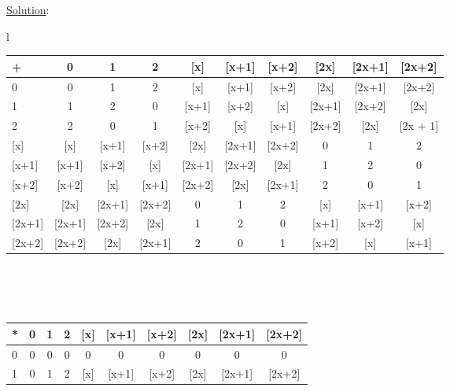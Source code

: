 \documentclass{article} %
\begin{document}
\underline{Solution}: 
\\
\begin{tabular}{l}
\begin{tabular}{l | c c c c c c c c c}
+               & 0            & 1             &     2        & [x]           & [x+1]     &[x+2]      & [2x]        & [2x+1] & [2x+2] \\ \hline
0                & 0            & 1             &     2        & [x]           & [x+1]     &[x+2]      & [2x]        & [2x+1] & [2x+2] \\
1                & 1            & 2             & 0            & [x+1]       & [x+2]    & [x]          & [2x+1]   & [2x+2] & [2x]      \\
2                & 2            & 0             & 1            & [x+2]       & [x]         & [x+1]     & [2x+2]   & [2x]     & [2x + 1] \\
{[}x]           & [x]         & [x+1]     & [x+2]     & [2x]         & [2x+1]  & [2x+2]    & 0            & 1          & 2            \\
{[}x+1]      & [x+1]     & [x+2]     & [x]         & [2x+1]     & [2x+2]  & [2x]        & 1            & 2           & 0           \\
{[}x+2]     & [x+2]      & [x]        & [x+1]     & [2x+2]    & [2x]       & [2x+1]   & 2            & 0          & 1            \\
{[}2x]         & [2x]       & [2x+1]    & [2x+2]   & 0             & 1           & 2             & [x]         & [x+1]   & [x+2]     \\
{[}2x+1]    & [2x+1]   & [2x+2]   & [2x]        & 1             & 2           & 0             & [x+1]     & [x+2]  & [x]          \\
{[}2x+2]  & [2x+2]     & [2x]        & [2x+1]   & 2             & 0           & 1             & [x+2]     & [x]       & [x+1]     \\
\end{tabular}  
\\ \\ \hline \\
\begin{tabular}{l | c c c c c c c c c}
*                & 0            & 1             &     2        & [x]           & [x+1]     &[x+2]      & [2x]        & [2x+1] & [2x+2] \\ \hline
0                & 0            & 0             &     0        & 0              & 0    &0      & 0          & 0 & 0 \\
1                 & 0            & 1             &     2        & [x]           & [x+1]     &[x+2]      & [2x]        & [2x+1] & [2x+2]      \\

\end{tabular}
\end{tabular}
\end{document}
